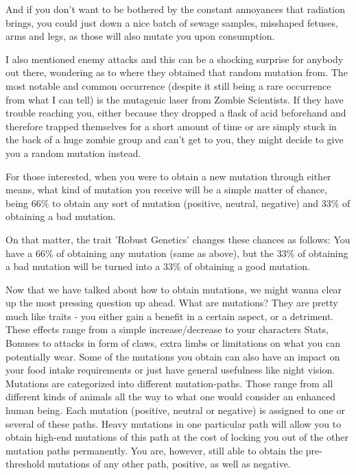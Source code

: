 And if you don't want to be bothered by the constant annoyances that radiation brings, you could just down a nice batch of sewage samples, misshaped fetuses, arms and legs, as those will also mutate you upon consumption.

I also mentioned enemy attacks and this can be a shocking surprise for anybody out there, wondering as to where they obtained that random mutation from. The most notable and common occurrence (despite it still being a rare occurrence from what I can tell) is the mutagenic laser from Zombie Scientists. If they have trouble reaching you, either because they dropped a flask of acid beforehand and therefore trapped themselves for a short amount of time or are simply stuck in the back of a huge zombie group and can't get to you, they might decide to give you a random mutation instead.

For those interested, when you were to obtain a new mutation through either means, what kind of mutation you receive will be a simple matter of chance, being 66\% to obtain any sort of mutation (positive, neutral, negative) and 33\% of obtaining a bad mutation.

On that matter, the trait 'Robust Genetics' changes these chances as follows: You have a 66\% of obtaining any mutation (same as above), but the 33\% of obtaining a bad mutation will be turned into a 33\% of obtaining a good mutation.

Now that we have talked about how to obtain mutations, we might wanna clear up the most pressing question up ahead. What are mutations?
They are pretty much like traits - you either gain a benefit in a certain aspect, or a detriment. These effects range from a simple increase/decrease to your characters Stats, Bonuses to attacks in form of claws, extra limbs or limitations on what you can potentially wear. Some of the mutations you obtain can also have an impact on your food intake requirements or just have general usefulness like night vision. Mutations are categorized into different mutation-paths. Those range from all different kinds of animals all the way to what one would consider an enhanced human being. Each mutation (positive, neutral or negative) is assigned to one or several of these paths. Heavy mutations in one particular path will allow you to obtain high-end mutations of this path at the cost of locking you out of the other mutation paths permanently. You are, however, still able to obtain the pre-threshold mutations of any other path, positive, as well as negative.

